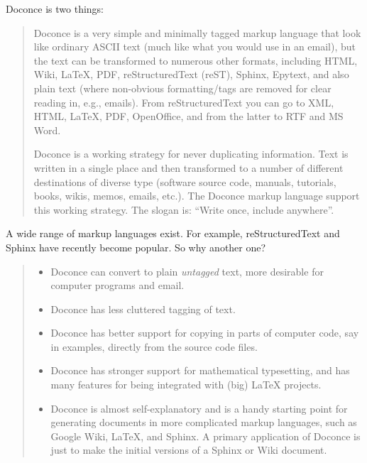 \documentclass[a4paper,english]{article}
\begin{document}
Doconce is two things:
%
\begin{quote}
\begin{list}{.}
{
\setlength{\rightmargin}{\leftmargin}
}

\item Doconce is a very simple and minimally tagged markup language that
look like ordinary ASCII text (much like what you would use in an
email), but the text can be transformed to numerous other formats,
including HTML, Wiki, LaTeX, PDF, reStructuredText (reST), Sphinx,
Epytext, and also plain text (where non-obvious formatting/tags are
removed for clear reading in, e.g., emails). From reStructuredText
you can go to XML, HTML, LaTeX, PDF, OpenOffice, and from the
latter to RTF and MS Word.

\item Doconce is a working strategy for never duplicating information.
Text is written in a single place and then transformed to
a number of different destinations of diverse type (software
source code, manuals, tutorials, books, wikis, memos, emails, etc.).
The Doconce markup language support this working strategy.
The slogan is: ``Write once, include anywhere''.
\end{list}

\end{quote}

A wide range of markup languages exist. For example, reStructuredText and Sphinx
have recently become popular. So why another one?
%
\begin{quote}
%
\begin{itemize}

\item Doconce can convert to plain \emph{untagged} text,
more desirable for computer programs and email.

\item Doconce has less cluttered tagging of text.

\item Doconce has better support for copying in parts of computer code,
say in examples, directly from the source code files.

\item Doconce has stronger support for mathematical typesetting, and
has many features for being integrated with (big) LaTeX projects.

\item Doconce is almost self-explanatory and is a handy starting point
for generating documents in more complicated markup languages, such
as Google Wiki, LaTeX, and Sphinx. A primary application of Doconce
is just to make the initial versions of a Sphinx or Wiki document.

\end{itemize}

\end{quote}
\end{document}
